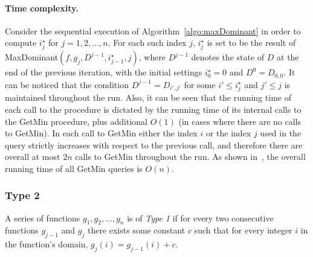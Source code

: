 \paragraph{Time complexity.}
Consider the sequential execution of Algorithm~\ref{algo:maxDominant} in order to compute $i^\star_j$ for $j = 1, 2, \ldots, n$. For each such index $j$, $i^\star_j$ is set to be the result of MaxDominant$(f, g_j, D^{j-1}, i^\star_{j-1}, j)$, where $D^{j-1}$ denotes the state of $D$ at the end of the previous iteration, with the initial settings $i^\star_0 = 0$ and $D^0 = D_{0, 0}$. It can be noticed that the condition $D^{j-1} = D_{i', j'}$ for some $i' \leq i^\star_j$ and $j' \leq j$ is maintained throughout the run. Also, it can be seen that the running time of each call to the procedure is dictated by the running time of its internal calls to the GetMin procedure, plus additional $O(1)$ (in cases where there are no calls to GetMin). In each call to GetMin either the index $i$ or the index $j$ used in the query strictly increases with respect to the previous call, and therefore there are overall at most $2n$ calls to GetMin throughout the run. As shown in~\cite{lee2007simple}, the overall running time of all GetMin queries is $O(n)$.


\subsubsection{Type 2}
A series of functions $g_1, g_2, \ldots, g_n$ is of \emph{Type 1} if for every two consecutive functions $g_{j-1}$ and $g_j$ there exists some constant $c$ such that for every integer $i$ in the function's domain, $g_j(i) = g_{j-1}(i) + c$.
